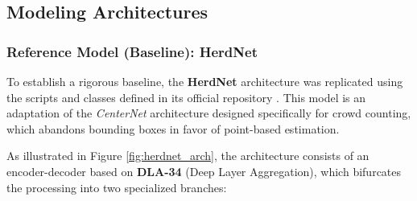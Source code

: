 \subsection{Modeling Architectures}

\subsubsection{Reference Model (Baseline): HerdNet}

To establish a rigorous baseline, the \textbf{HerdNet} architecture was replicated using the scripts and classes defined in its official repository \cite{herdnet}. This model is an adaptation of the \textit{CenterNet} architecture designed specifically for crowd counting, which abandons bounding boxes in favor of point-based estimation.

As illustrated in Figure \ref{fig:herdnet_arch}, the architecture consists of an encoder-decoder based on \textbf{DLA-34} (Deep Layer Aggregation), which bifurcates the processing into two specialized branches:


